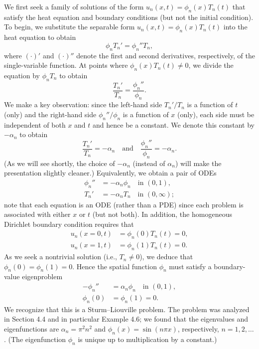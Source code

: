 We first seek a family of solutions of the form $u_n(x, t) = \phi_n(x) T_n(t)$ that satisfy the heat equation and boundary conditions (but not the initial condition). To begin, we substitute the separable form $u_n(x, t) = \phi_n(x) T_n(t)$ into the heat equation to obtain
\[\phi_n T_n' = \phi_n'' T_n,\]
where $(\cdot)'$ and $(\cdot)''$ denote the first and second derivatives, respectively, of the single-variable function. At points where $\phi_n(x) T_n(t) \neq 0$, we divide the equation by $\phi_n T_n$ to obtain
\[\frac{T_n'}{T_n} = \frac{\phi_n''}{\phi_n}.\]
We make a key observation: since the left-hand side $T_n'/T_n$ is a function of $t$ (only) and the right-hand side $\phi_n''/\phi_n$ is a function of $x$ (only), each side must be independent of both $x$ and $t$ and hence be a constant. We denote this constant by $-\alpha_n$ to obtain
\[\frac{T_n'}{T_n} = -\alpha_n \quad \text{and} \quad \frac{\phi_n''}{\phi_n} = -\alpha_n.\]
(As we will see shortly, the choice of $-\alpha_n$ (instead of $\alpha_n$) will make the presentation slightly cleaner.) Equivalently, we obtain a pair of ODEs
\begin{align*}
    \phi_n'' &= -\alpha_n \phi_n \quad \text{in } (0, 1), \\
    T_n' &= -\alpha_n T_n \quad \text{in } (0, \infty);
\end{align*}
note that each equation is an ODE (rather than a PDE) since each problem is associated with either $x$ or $t$ (but not both). In addition, the homogeneous Dirichlet boundary condition requires that
\begin{align*}
    u_n(x = 0, t) &= \phi_n(0) T_n(t) = 0, \\
    u_n(x = 1, t) &= \phi_n(1) T_n(t) = 0.
\end{align*}
As we seek a nontrivial solution (i.e., $T_n \neq 0$), we deduce that $\phi_n(0) = \phi_n(1) = 0$. Hence the spatial function $\phi_n$ must satisfy a boundary-value eigenproblem
\begin{equation*}
    \begin{aligned}
        -\phi_n'' &= \alpha_n \phi_n \quad \text{in } (0, 1), \\
        \phi_n(0) &= \phi_n(1) = 0.
    \end{aligned} \tag{6.1}
\end{equation*}
We recognize that this is a Sturm--Liouville problem. The problem was analyzed in Section 4.4 and in particular Example 4.6; we found that the eigenvalues and eigenfunctions are $\alpha_n = \pi^2 n^2$ and $\phi_n(x) = \sin(n\pi x)$, respectively, $n = 1, 2, \dots$. (The eigenfunction $\phi_n$ is unique up to multiplication by a constant.)

